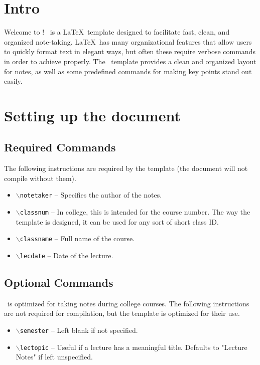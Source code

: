 \documentclass{ClassTeX}
\begin{document}
	\maketitle
	\section{Intro}
	Welcome to \ClassTeX!  \ClassTeX\ is a \LaTeX\ template designed to facilitate fast, clean, and organized note-taking.  \LaTeX\ has many organizational features that allow users to quickly format text in elegant ways, but often these require verbose commands in order to achieve properly.  The \ClassTeX\ template provides a clean and organized layout for notes, as well as some predefined commands for making key points stand out easily.
	
	\section{Setting up the document}
	
	\subsection{Required Commands}
	The following instructions are required by the template (the document will not compile without them).
	\begin{itemize}
		\item \texttt{$\backslash$notetaker} -- Specifies the author of the notes.
		\item \texttt{$\backslash$classnum} -- In college, this is intended for the course number.  The way the template is designed, it can be used for any sort of short class ID.
		\item \texttt{$\backslash$classname} -- Full name of the course.
		\item \texttt{$\backslash$lecdate} -- Date of the lecture.
	\end{itemize}
	
	\subsection{Optional Commands}
	\ClassTeX\ is optimized for taking notes during college courses.  The following instructions are not required for compilation, but the template is optimized for their use.
	\begin{itemize}
		\item \texttt{$\backslash$semester} -- Left blank if not specified.
		\item \texttt{$\backslash$lectopic} -- Useful if a lecture has a meaningful title.  Defaults to "Lecture Notes" if left unspecified.
	\end{itemize}
\end{document}
